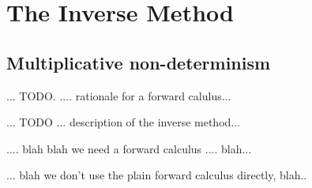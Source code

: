 \section{The Inverse Method}

\subsection{Multiplicative non-determinism}

... TODO. .... rationale for a forward calulus...

... TODO ... description of the inverse method...


.... blah blah we need a forward calculus .... blah...

... blah we don't use the plain forward calculus directly, blah..





